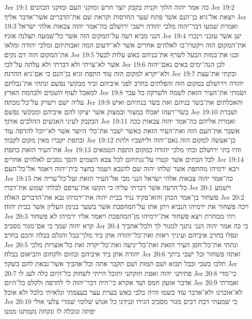 Jer 19:1  כה אמר יהוה הלוך וקנית בקבק יוצר חרשׂ ומזקני העם ומזקני הכהנים׃
Jer 19:2  ויצאת אל־גיא בן־הנם אשׁר פתח שׁער החרסות וקראת שׁם את־הדברים אשׁר־אדבר אליך׃
Jer 19:3  ואמרת שׁמעו דבר־יהוה מלכי יהודה וישׁבי ירושׁלם כה־אמר יהוה צבאות אלהי ישׂראל הנני מביא רעה על־המקום הזה אשׁר כל־שׁמעה תצלנה אזניו׃
Jer 19:4  יען אשׁר עזבני וינכרו את־המקום הזה ויקטרו־בו לאלהים אחרים אשׁר לא־ידעום המה ואבותיהם ומלכי יהודה ומלאו את־המקום הזה דם נקים׃
Jer 19:5  ובנו את־במות הבעל לשׂרף את־בניהם באשׁ עלות לבעל אשׁר לא־צויתי ולא דברתי ולא עלתה על־לבי׃
Jer 19:6  לכן הנה־ימים באים נאם־יהוה ולא־יקרא למקום הזה עוד התפת וגיא בן־הנם כי אם־גיא ההרגה׃
Jer 19:7  ובקתי את־עצת יהודה וירושׁלם במקום הזה והפלתים בחרב לפני איביהם וביד מבקשׁי נפשׁם ונתתי את־נבלתם למאכל לעוף השׁמים ולבהמת הארץ׃
Jer 19:8  ושׂמתי את־העיר הזאת לשׁמה ולשׁרקה כל עבר עליה ישׁם וישׁרק על־כל־מכתה׃
Jer 19:9  והאכלתים את־בשׂר בניהם ואת בשׂר בנתיהם ואישׁ בשׂר־רעהו יאכלו במצור ובמצוק אשׁר יציקו להם איביהם ומבקשׁי נפשׁם׃
Jer 19:10  ושׁברת הבקבק לעיני האנשׁים ההלכים אותך׃
Jer 19:11  ואמרת אליהם כה־אמר יהוה צבאות ככה אשׁבר את־העם הזה ואת־העיר הזאת כאשׁר ישׁבר את־כלי היוצר אשׁר לא־יוכל להרפה עוד ובתפת יקברו מאין מקום לקבור׃
Jer 19:12  כן־אעשׂה למקום הזה נאם־יהוה וליושׁביו ולתת את־העיר הזאת כתפת׃
Jer 19:13  והיו בתי ירושׁלם ובתי מלכי יהודה כמקום התפת הטמאים לכל הבתים אשׁר קטרו על־גגתיהם לכל צבא השׁמים והסך נסכים לאלהים אחרים׃
Jer 19:14  ויבא ירמיהו מהתפת אשׁר שׁלחו יהוה שׁם להנבא ויעמד בחצר בית־יהוה ויאמר אל־כל־העם׃
Jer 19:15  כה־אמר יהוה צבאות אלהי ישׂראל הנני מבי אל־העיר הזאת ועל־כל־עריה את כל־הרעה אשׁר דברתי עליה כי הקשׁו את־ערפם לבלתי שׁמוע את־דברי׃
Jer 20:1  וישׁמע פשׁחור בן־אמר הכהן והוא־פקיד נגיד בבית יהוה את־ירמיהו נבא את־הדברים האלה׃
Jer 20:2  ויכה פשׁחור את ירמיהו הנביא ויתן אתו על־המהפכת אשׁר בשׁער בנימן העליון אשׁר בבית יהוה׃
Jer 20:3  ויהי ממחרת ויצא פשׁחור את־ירמיהו מן־המהפכת ויאמר אליו ירמיהו לא פשׁחור קרא יהוה שׁמך כי אם־מגור מסביב׃
Jer 20:4  כי כה אמר יהוה הנני נתנך למגור לך ולכל־אהביך ונפלו בחרב איביהם ועיניך ראות ואת־כל־יהודה אתן ביד מלך־בבל והגלם בבלה והכם בחרב׃
Jer 20:5  ונתתי את־כל־חסן העיר הזאת ואת־כל־יגיעה ואת־כל־יקרה ואת כל־אוצרות מלכי יהודה אתן ביד איביהם ובזזום ולקחום והביאום בבלה׃
Jer 20:6  ואתה פשׁחור וכל ישׁבי ביתך תלכו בשׁבי ובבל תבוא ושׁם תמות ושׁם תקבר אתה וכל־אהביך אשׁר־נבאת להם בשׁקר׃
Jer 20:7  פתיתני יהוה ואפת חזקתני ותוכל הייתי לשׂחוק כל־היום כלה לעג לי׃
Jer 20:8  כי־מדי אדבר אזעק חמס ושׁד אקרא כי־היה דבר־יהוה לי לחרפה ולקלס כל־היום׃
Jer 20:9  ואמרתי לא־אזכרנו ולא־אדבר עוד בשׁמו והיה בלבי כאשׁ בערת עצר בעצמתי ונלאיתי כלכל ולא אוכל׃
Jer 20:10  כי שׁמעתי דבת רבים מגור מסביב הגידו ונגידנו כל אנושׁ שׁלומי שׁמרי צלעי אולי יפתה ונוכלה לו ונקחה נקמתנו ממנו׃
